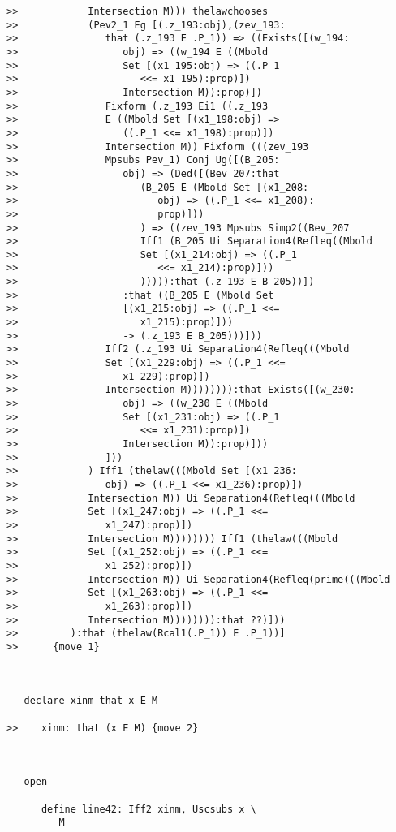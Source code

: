 \documentclass[12pt]{article}
\begin{document}
\begin{verbatim}
>>            Intersection M))) thelawchooses
>>            (Pev2_1 Eg [(.z_193:obj),(zev_193:
>>               that (.z_193 E .P_1)) => ((Exists([(w_194:
>>                  obj) => ((w_194 E ((Mbold
>>                  Set [(x1_195:obj) => ((.P_1
>>                     <<= x1_195):prop)])
>>                  Intersection M)):prop)])
>>               Fixform (.z_193 Ei1 ((.z_193
>>               E ((Mbold Set [(x1_198:obj) =>
>>                  ((.P_1 <<= x1_198):prop)])
>>               Intersection M)) Fixform (((zev_193
>>               Mpsubs Pev_1) Conj Ug([(B_205:
>>                  obj) => (Ded([(Bev_207:that
>>                     (B_205 E (Mbold Set [(x1_208:
>>                        obj) => ((.P_1 <<= x1_208):
>>                        prop)]))
>>                     ) => ((zev_193 Mpsubs Simp2((Bev_207
>>                     Iff1 (B_205 Ui Separation4(Refleq((Mbold
>>                     Set [(x1_214:obj) => ((.P_1
>>                        <<= x1_214):prop)]))
>>                     ))))):that (.z_193 E B_205))])
>>                  :that ((B_205 E (Mbold Set
>>                  [(x1_215:obj) => ((.P_1 <<=
>>                     x1_215):prop)]))
>>                  -> (.z_193 E B_205)))]))
>>               Iff2 (.z_193 Ui Separation4(Refleq(((Mbold
>>               Set [(x1_229:obj) => ((.P_1 <<=
>>                  x1_229):prop)])
>>               Intersection M)))))))):that Exists([(w_230:
>>                  obj) => ((w_230 E ((Mbold
>>                  Set [(x1_231:obj) => ((.P_1
>>                     <<= x1_231):prop)])
>>                  Intersection M)):prop)]))
>>               ]))
>>            ) Iff1 (thelaw(((Mbold Set [(x1_236:
>>               obj) => ((.P_1 <<= x1_236):prop)])
>>            Intersection M)) Ui Separation4(Refleq(((Mbold
>>            Set [(x1_247:obj) => ((.P_1 <<=
>>               x1_247):prop)])
>>            Intersection M)))))))) Iff1 (thelaw(((Mbold
>>            Set [(x1_252:obj) => ((.P_1 <<=
>>               x1_252):prop)])
>>            Intersection M)) Ui Separation4(Refleq(prime(((Mbold
>>            Set [(x1_263:obj) => ((.P_1 <<=
>>               x1_263):prop)])
>>            Intersection M)))))))):that ??)]))
>>         ):that (thelaw(Rcal1(.P_1)) E .P_1))]
>>      {move 1}



   declare xinm that x E M

>>    xinm: that (x E M) {move 2}



   open

      define line42: Iff2 xinm, Uscsubs x \
         M


\end{verbatim}
\end{document}
